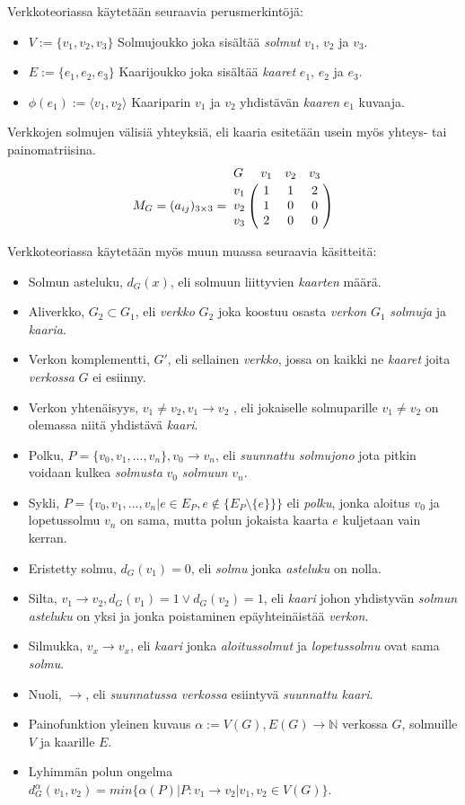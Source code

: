   Verkkoteoriassa käytetään seuraavia perusmerkintöjä:
  \begin{itemize}
    \item \(V := \{v_1, v_2, v_3\}\) Solmujoukko joka sisältää \emph{solmut} \(v_1\), \(v_2\) ja \(v_3\).
    \item \(E := \{e_1, e_2, e_3\}\) Kaarijoukko joka sisältää \emph{kaaret} \(e_1\), \(e_2\) ja \(e_3\).
    \item \(\phi(e_1) := \langle v_1, v_2 \rangle\) Kaariparin \(v_1\) ja \(v_2\) yhdistävän \emph{kaaren} \(e_1\) kuvaaja.
  \end{itemize}

  Verkkojen solmujen välisiä yhteyksiä, eli kaaria esitetään usein myös yhteys- tai painomatriisina.
  \[
    M_G = (a_{ij})_{3\times3} =
    \bordermatrix{
      G & v_1 & v_2 & v_3 \cr
      v_1 & 1 & 1 & 2 \cr
      v_2 & 1 & 0 & 0 \cr
      v_3 & 2 & 0 & 0 \cr
    }
  \]

  Verkkoteoriassa käytetään myös muun muassa seuraavia käsitteitä:
  \begin{itemize}
    \item Solmun asteluku, \(d_G(x)\), eli solmuun liittyvien \emph{kaarten} määrä.
    \item Aliverkko, \(G_2 \subset G_1\), eli \emph{verkko} \(G_2\) joka koostuu osasta \emph{verkon} \(G_1\) \emph{solmuja} ja \emph{kaaria}.
    \item Verkon komplementti, \(G'\), eli sellainen \emph{verkko}, jossa on kaikki ne \emph{kaaret} joita \emph{verkossa} \(G\) ei esiinny.
    \item Verkon yhtenäisyys, \(v_1 \neq v_2, v_1 \rightarrow v_2\) , eli jokaiselle solmuparille \(v_1 \neq v_2\) on olemassa niitä yhdistävä \emph{kaari}.
    \item Polku, \(P = \{v_0, v_1, ..., v_n\}, v_0 \rightarrow v_n\), eli \emph{suunnattu solmujono} jota pitkin voidaan kulkea \emph{solmusta} \(v_0\) \emph{solmuun} \(v_n\).
    \item Sykli, \(P = \{v_0, v_1, ..., v_n| e \in E_P, e \notin \{E_P \setminus \{e\} \}\}\) eli \emph{polku}, jonka aloitus \(v_0\) ja lopetussolmu \(v_n\) on sama, mutta polun jokaista kaarta \(e\) kuljetaan vain kerran.
    \item Eristetty solmu, \(d_G(v_1) = 0\), eli \emph{solmu} jonka \emph{asteluku} on nolla.
    \item Silta, \(v_1 \rightarrow v_2, d_G(v_1) = 1 \lor d_G(v_2) = 1\), eli \emph{kaari} johon yhdistyvän \emph{solmun asteluku} on yksi ja jonka poistaminen epäyhteinäistää \emph{verkon}.
    \item Silmukka, \(v_x \rightarrow v_x\), eli \emph{kaari} jonka \emph{aloitussolmut} ja \emph{lopetussolmu} ovat sama \emph{solmu}.
    \item Nuoli, \(\rightarrow\), eli \emph{suunnatussa verkossa} esiintyvä \emph{suunnattu kaari}.
    \item Painofunktion yleinen kuvaus \(\alpha := V(G), E(G) \rightarrow \mathbb{N}\) verkossa \(G\), solmuille \(V\) ja kaarille \(E\).
    \item Lyhimmän polun ongelma \(d_G^\alpha(v_1, v_2) = min\{\alpha(P) | P:v_1 \rightarrow v_2 | v_1, v_2 \in V(G)\}\).
  \end{itemize}

